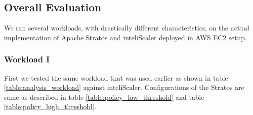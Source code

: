 \subsection{Overall Evaluation}

We ran several workloads, with drastically different characteristics, on the actual implementation of Apache Stratos and inteliScaler deployed in AWS EC2 setup.

\subsubsection{Workload I}
First we tested the same workload that was used earlier as shown in table \ref{table:analysis_workload} against inteliScaler.  Configurations of the Stratos are same as described in table \ref{table:policy_low_threshold} and table \ref{table:policy_high_threshold}.